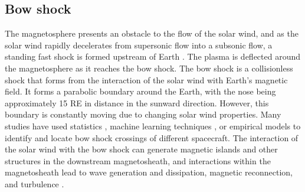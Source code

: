 \subsection{Bow shock}
The magnetosphere presents an obstacle to the flow of the solar wind, and as the solar wind rapidly decelerates from supersonic flow into a subsonic flow, a standing fast shock is formed upstream of Earth \citep{Dimmock:2013}. The plasma is deflected around the magnetosphere as it reaches the bow shock. The bow shock is a collisionless shock that forms from the interaction of the solar wind with Earth's magnetic field. It forms a parabolic boundary around the Earth, with the nose being approximately 15 \gls{RE} in distance in the sunward direction. However, this boundary is constantly moving due to changing solar wind properties. Many studies have used statistics \citep{Kruparova:2019}, machine learning techniques \citep{Lalti:2022}, or empirical models \citep{chapman_three-dimensional_2003} to identify and locate bow shock crossings of different spacecraft. The interaction of the solar wind with the bow shock can generate magnetic islands and other structures \citep{Karimabadi:2014} in the downstream magnetosheath, and interactions within the magnetosheath lead to wave generation and dissipation, magnetic reconnection, and turbulence \citep{Shaikh:2022}. %

